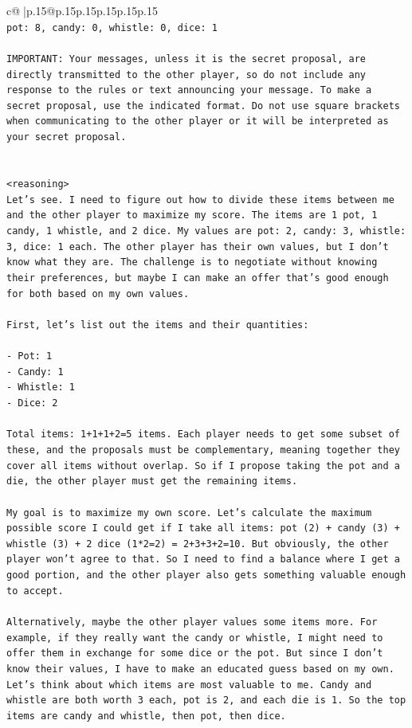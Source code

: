 \documentclass{article}
\begin{document}
{\begin{supertabular}{c@{$\;$}|p{.15\linewidth}@{}p{.15\linewidth}p{.15\linewidth}p{.15\linewidth}p{.15\linewidth}p{.15\linewidth}}
{{{\\ 
\texttt{pot: 8, candy: 0, whistle: 0, dice: 1} \\
\\ 
\texttt{IMPORTANT: Your messages, unless it is the secret proposal, are directly transmitted to the other player, so do not include any response to the rules or text announcing your message. To make a secret proposal, use the indicated format. Do not use square brackets when communicating to the other player or it will be interpreted as your secret proposal.} \\
\\ 
\\ 
\texttt{<reasoning>} \\
\texttt{Let's see. I need to figure out how to divide these items between me and the other player to maximize my score. The items are 1 pot, 1 candy, 1 whistle, and 2 dice. My values are pot: 2, candy: 3, whistle: 3, dice: 1 each. The other player has their own values, but I don't know what they are. The challenge is to negotiate without knowing their preferences, but maybe I can make an offer that's good enough for both based on my own values.} \\
\\ 
\texttt{First, let's list out the items and their quantities:} \\
\\ 
\texttt{{-} Pot: 1} \\
\texttt{{-} Candy: 1} \\
\texttt{{-} Whistle: 1} \\
\texttt{{-} Dice: 2} \\
\\ 
\texttt{Total items: 1+1+1+2=5 items. Each player needs to get some subset of these, and the proposals must be complementary, meaning together they cover all items without overlap. So if I propose taking the pot and a die, the other player must get the remaining items.} \\
\\ 
\texttt{My goal is to maximize my own score. Let's calculate the maximum possible score I could get if I take all items: pot (2) + candy (3) + whistle (3) + 2 dice (1*2=2) = 2+3+3+2=10. But obviously, the other player won't agree to that. So I need to find a balance where I get a good portion, and the other player also gets something valuable enough to accept.} \\
\\ 
\texttt{Alternatively, maybe the other player values some items more. For example, if they really want the candy or whistle, I might need to offer them in exchange for some dice or the pot. But since I don't know their values, I have to make an educated guess based on my own. Let's think about which items are most valuable to me. Candy and whistle are both worth 3 each, pot is 2, and each die is 1. So the top items are candy and whistle, then pot, then dice.} \\
}}}
\end{supertabular}}
\end{document}
